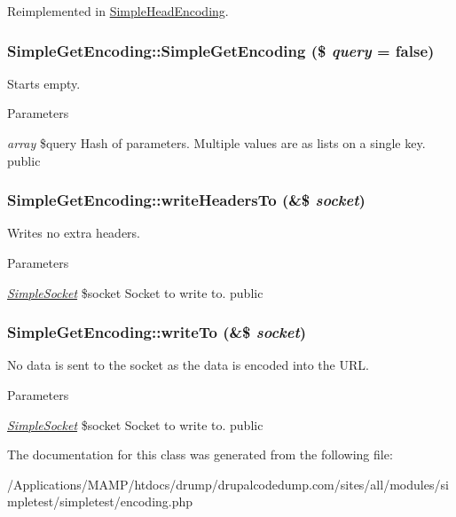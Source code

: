 Reimplemented in \hyperlink{class_simple_head_encoding_acaa746a7c7f8b5c032d5c35504ab68d7}{SimpleHeadEncoding}.\hypertarget{class_simple_get_encoding_a4f6014c0234211c8281c85e9f67c2a2e}{
\subsubsection[{SimpleGetEncoding}]{\setlength{\rightskip}{0pt plus 5cm}SimpleGetEncoding::SimpleGetEncoding (\$ {\em query} = {\ttfamily false})}}
\label{class_simple_get_encoding_a4f6014c0234211c8281c85e9f67c2a2e}
Starts empty. 
\begin{DoxyParams}{Parameters}
\item[{\em array}]\$query Hash of parameters. Multiple values are as lists on a single key.  public \end{DoxyParams}
\hypertarget{class_simple_get_encoding_af4b6545b1d70c926b32530bc388cf73e}{
\subsubsection[{writeHeadersTo}]{\setlength{\rightskip}{0pt plus 5cm}SimpleGetEncoding::writeHeadersTo (\&\$ {\em socket})}}
\label{class_simple_get_encoding_af4b6545b1d70c926b32530bc388cf73e}
Writes no extra headers. 
\begin{DoxyParams}{Parameters}
\item[{\em \hyperlink{class_simple_socket}{SimpleSocket}}]\$socket Socket to write to.  public \end{DoxyParams}
\hypertarget{class_simple_get_encoding_a5d9365a3daabf8ec9cd6f33d3ed1c942}{
\subsubsection[{writeTo}]{\setlength{\rightskip}{0pt plus 5cm}SimpleGetEncoding::writeTo (\&\$ {\em socket})}}
\label{class_simple_get_encoding_a5d9365a3daabf8ec9cd6f33d3ed1c942}
No data is sent to the socket as the data is encoded into the URL. 
\begin{DoxyParams}{Parameters}
\item[{\em \hyperlink{class_simple_socket}{SimpleSocket}}]\$socket Socket to write to.  public \end{DoxyParams}


The documentation for this class was generated from the following file:\begin{DoxyCompactItemize}
\item 
/Applications/MAMP/htdocs/drump/drupalcodedump.com/sites/all/modules/simpletest/simpletest/encoding.php\end{DoxyCompactItemize}
